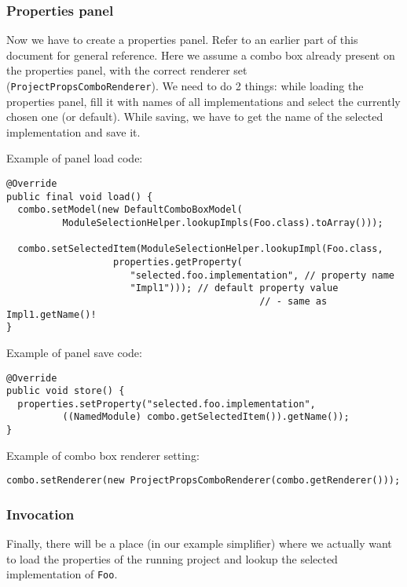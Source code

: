 \documentclass[a4paper,10pt,oneside]{article}
\begin{document}
\subsubsection*{Properties panel}

\par 
  Now we have to create a properties panel. Refer to an
  earlier part of this document for general
  reference. Here we assume a combo box already present on the properties panel,
  with the correct renderer set (\texttt{ProjectPropsComboRenderer}).
  We need to do 2 things: while loading the properties panel, fill it with
  names of all implementations and select the currently chosen one (or default).
  While saving, we have to get the name of
  the selected implementation and save it.


Example of panel load code:
\begin{verbatim}
@Override
public final void load() {
  combo.setModel(new DefaultComboBoxModel(
          ModuleSelectionHelper.lookupImpls(Foo.class).toArray()));

  combo.setSelectedItem(ModuleSelectionHelper.lookupImpl(Foo.class,
                   properties.getProperty(
                      "selected.foo.implementation", // property name
                      "Impl1"))); // default property value
                                             // - same as Impl1.getName()!
}
\end{verbatim}

Example of panel save code:
\begin{verbatim}
@Override
public void store() {
  properties.setProperty("selected.foo.implementation",
          ((NamedModule) combo.getSelectedItem()).getName());
}
\end{verbatim}

Example of combo box renderer setting:
\begin{verbatim}
combo.setRenderer(new ProjectPropsComboRenderer(combo.getRenderer()));
\end{verbatim}

\subsubsection*{Invocation}

\par 
  Finally, there will be a place (in our example simplifier) where we actually
  want to load the properties of the running project and lookup the selected
  implementation of \texttt{Foo}.
\end{document}
